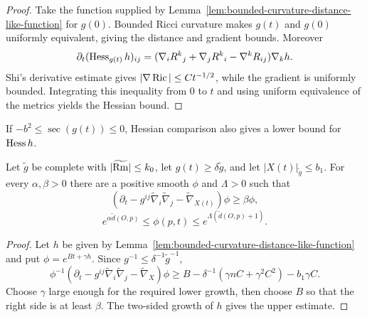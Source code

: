 \begin{proof}
\sketch
{}
Take the function supplied by
Lemma~\ref{lem:bounded-curvature-distance-like-function} for $g(0)$.  Bounded
Ricci curvature makes $g(t)$ and $g(0)$ uniformly equivalent, giving the
distance and gradient bounds.  Moreover
\[
\partial_t(\operatorname{Hess}_{g(t)}h)_{ij}
=(\nabla_iR^k{}_j+\nabla_jR^k{}_i-\nabla^kR_{ij})\nabla_kh.
\]
Shi's derivative estimate gives $|\nabla\operatorname{Ric}|\leq C t^{-1/2}$, while the
gradient is uniformly bounded.  Integrating this inequality from $0$ to $t$
and using uniform equivalence of the metrics yields the Hessian bound.
\end{proof}

\begin{remark}
\label{rem:distance-like-hessian-lower-bound}


If $-b^2\leq\sec(g(t))\leq0$, Hessian comparison also gives a lower bound for
$\operatorname{Hess} h$.
\end{remark}

\begin{lemma}
\label{lem:general-metric-barrier-supersolution}

Let $\widetilde g$ be complete with $|\widetilde{\operatorname{Rm}}|\leq k_0$, let
$g(t)\geq\delta\widetilde g$, and let $|X(t)|_{\widetilde g}\leq b_1$.  For
every $\alpha,\beta>0$ there are a positive smooth $\phi$ and $\Lambda>0$ such
that
\[
(\partial_t-g^{ij}\widetilde\nabla_i\widetilde\nabla_j
-\widetilde\nabla_{X(t)})\phi\geq\beta\phi,
\]
\[
e^{\alpha\widetilde d(O,p)}\leq\phi(p,t)
 \leq e^{\Lambda(\widetilde d(O,p)+1)}.
\]
\end{lemma}

\begin{proof}
\sketch
{}
Let $h$ be given by Lemma~\ref{lem:bounded-curvature-distance-like-function}
and put $\phi=e^{Bt+\gamma h}$.  Since $g^{-1}\leq\delta^{-1}\widetilde
g^{-1}$,
\[
\phi^{-1}(\partial_t-g^{ij}\widetilde\nabla_i\widetilde\nabla_j
-\widetilde\nabla_X)\phi
\geq B-\delta^{-1}(\gamma nC+\gamma^2C^2)-b_1\gamma C.
\]
Choose $\gamma$ large enough for the required lower growth, then choose $B$
so that the right side is at least $\beta$.  The two-sided growth of $h$
gives the upper estimate.
\end{proof}

